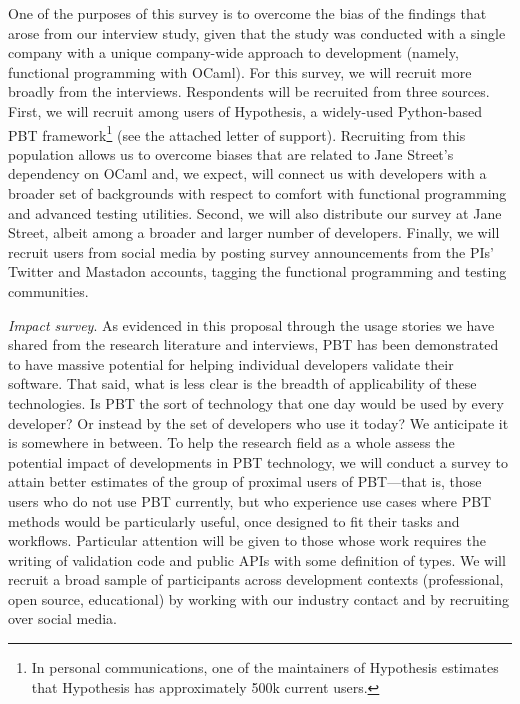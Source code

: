 One of the purposes of this survey is to overcome the bias
of the findings that arose from our interview study, given
that the study was conducted with a single company with a
unique company-wide approach to development (namely,
functional programming with OCaml). For this survey, we will
recruit more broadly from the interviews. Respondents will
be recruited from three sources. First, we will recruit
among users of Hypothesis, a widely-used Python-based PBT
framework\footnote{In personal communications, one of the
maintainers of Hypothesis estimates that Hypothesis has
approximately 500k current users. } (see the attached letter of support). Recruiting from this population allows us to overcome
biases that are related to Jane Street's dependency on OCaml
and, we expect, will connect us with developers with a
broader set of backgrounds with respect to comfort with
functional programming and advanced testing utilities.
Second, we will also distribute our survey at Jane Street,
albeit among a broader and larger number of developers.
Finally, we will recruit users from social media by posting
survey announcements from the PIs' Twitter and Mastadon
accounts, tagging the functional programming and testing
communities. 

\emph{Impact survey}. As evidenced in this proposal through
the usage stories we have shared from the research
literature and interviews, PBT has been demonstrated to have
massive potential for helping individual developers validate
their software. That said, what is less clear is the breadth
of applicability of these technologies. Is PBT the sort of
technology that one day would be used by every developer? Or
instead by the set of developers who use it today? We
anticipate it is somewhere in between. To help the research
field as a whole assess the potential impact of developments
in PBT technology, we will conduct a survey to attain better
estimates of the group of proximal users of PBT---that is,
those users who do not use PBT currently, but who experience
use cases where PBT methods would be particularly useful,
once designed to fit their tasks and workflows. Particular
attention will be given to those whose work requires the
writing of validation code and public APIs with some
definition of types. We will recruit a broad sample of
participants across development contexts (professional, open
source, educational) by working with our industry contact
and by recruiting over social media. 

